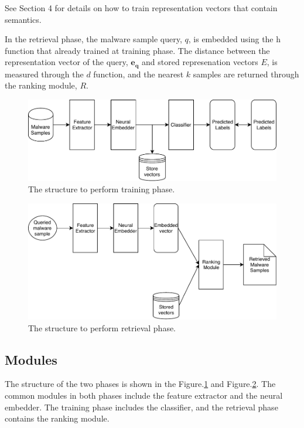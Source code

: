 See Section 4 for details on how to train representation vectors that contain semantics.
 
In the retrieval phase, the malware sample query, $q$, is embedded using the h function that already trained at training phase. The distance between the representation vector of the query, $\mathbf{e_q}$ and stored represenation vectors $E$, is measured through the $d$ function, and the nearest $k$ samples are returned through the ranking module, $R$.

\begin{figure}[!htb] %
  \includegraphics[width=\linewidth]{../../figures/train_phase.pdf}
  \caption{The structure to perform training phase.}
  \label{fig:train_phase}
\end{figure}

\begin{figure}[!htb] %
  \includegraphics[width=\linewidth]{../../figures/retrieval_phase.pdf}
  \caption{The structure to perform retrieval phase.}
  \label{fig:retrieval_phase}
\end{figure}


\subsection{Modules}
The structure of the two phases is shown in the Figure.\ref{fig:train_phase} and Figure.\ref{fig:retrieval_phase}. The common modules in both phases include the feature extractor and the neural embedder. The training phase includes the classifier, and the retrieval phase contains the ranking module.


